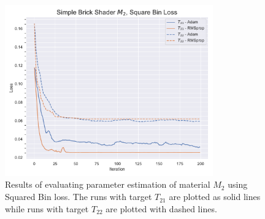 \begin{figure}[hpb]
    \centering
    \includegraphics[width=0.8\textwidth]{img/evaluation/M2/SBS_SBL.pdf}
    \caption{Results of evaluating parameter estimation of material $M_2$ using Squared Bin loss. The runs with target $T_{21}$ are plotted as solid lines while runs with target $T_{22}$ are plotted with dashed lines.}
    \label{fig:M2SBLData}
\end{figure}

